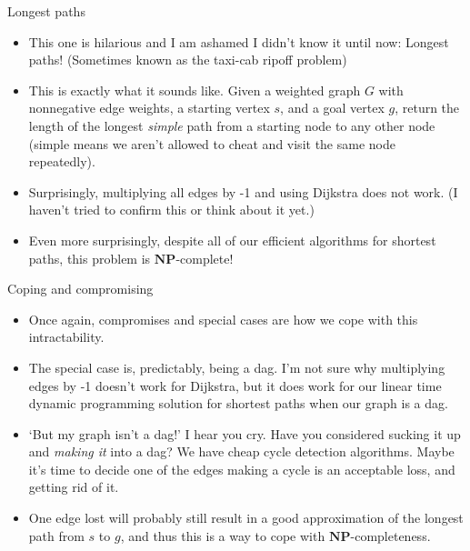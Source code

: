 \documentclass{beamer}
\begin{document}
\begin{frame}{Longest paths}
    \begin{itemize}
        \item This one is hilarious and I am ashamed I didn't know it until now: Longest paths! (Sometimes known as the taxi-cab ripoff problem) \pause 
        \item This is exactly what it sounds like. Given a weighted graph $G$ with nonnegative edge weights, a starting vertex $s$, and a goal vertex $g$, return the length of the longest \emph{simple} path from a starting node to any other node (simple means we aren't allowed to cheat and visit the same node repeatedly). \pause
        \item Surprisingly, multiplying all edges by -1 and using Dijkstra does not work. (I haven't tried to confirm this or think about it yet.) \pause 
        \item Even more surprisingly, despite all of our efficient algorithms for shortest paths, this problem is $\mathbf{NP}$-complete! \pause 
    \end{itemize}
\end{frame}

\begin{frame}{Coping and compromising}
    \begin{itemize}
        \item Once again, compromises and special cases are how we cope with this intractability. \pause 
        \item The special case is, predictably, being a dag. I'm not sure why multiplying edges by -1 doesn't work for Dijkstra, but it does work for our linear time dynamic programming solution for shortest paths when our graph is a dag. \pause 
        \item `But my graph isn't a dag!' I hear you cry. Have you considered sucking it up and \emph{making it} into a dag? We have cheap cycle detection algorithms. Maybe it's time to decide one of the edges making a cycle is an acceptable loss, and getting rid of it. \pause 
        \item One edge lost will probably still result in a good approximation of the longest path from $s$ to $g$, and thus this is a way to cope with $\mathbf{NP}$-completeness.
    \end{itemize}
\end{frame}
\end{document}
